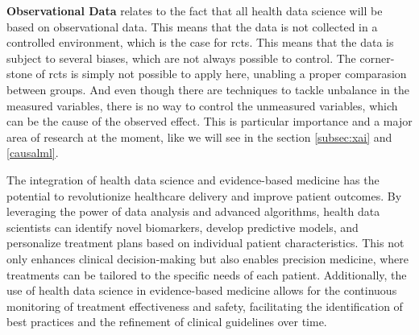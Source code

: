 
\textbf{Observational Data} relates to the fact that all health data science will be based on observational data. This means that the data is not collected in a controlled environment, which is the case for \acp{rct}. This means that the data is subject to several biases, which are not always possible to control. The corner-stone of \acp{rct} is simply not possible to apply here, unabling a proper comparasion between groups. And even though there are techniques to tackle unbalance in the measured variables, there is no way to control the unmeasured variables, which can be the cause of the observed effect. This is particular importance and a major area of research at the moment, like we will see in the section \ref{subsec:xai} and \ref{causalml}.


The integration of health data science and evidence-based medicine has the potential to revolutionize healthcare delivery and improve patient outcomes. By leveraging the power of data analysis and advanced algorithms, health data scientists can identify novel biomarkers, develop predictive models, and personalize treatment plans based on individual patient characteristics. This not only enhances clinical decision-making but also enables precision medicine, where treatments can be tailored to the specific needs of each patient. Additionally, the use of health data science in evidence-based medicine allows for the continuous monitoring of treatment effectiveness and safety, facilitating the identification of best practices and the refinement of clinical guidelines over time.

